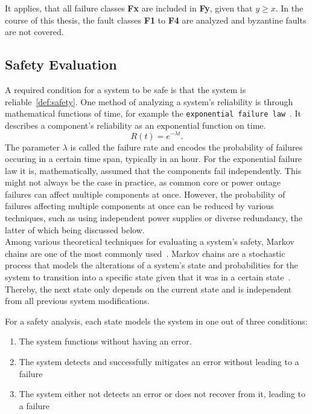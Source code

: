 It applies, that all failure classes \textbf{Fx} are included in \textbf{Fy}, given that $y \geq x$.
In the course of this thesis, the fault classes \textbf{F1} to \textbf{F4} are analyzed and byzantine faults are not covered.

\subsection{Safety Evaluation}
\label{sec:safetyEvaluation}
A required condition for a system to be safe is that the system is reliable~\autoref{def:safety}.
One method of analyzing a system's reliability is through mathematical functions of time, for example the \texttt{exponential failure law}~\cite{GeffroyMotetDependableComputing}.
It describes a component's reliability as an exponential function on time.
\begin{equation}
R(t) = e^{-\lambda t}.
\label{eq:expFailureLaw}
\end{equation}
The parameter $\lambda$ is called the failure rate and encodes the probability of failures occuring in a certain time span, typically in an hour.
For the exponential failure law it is, mathematically, assumed that the components fail independently.
This might not always be the case in practice, as common core or power outage failures can affect multiple components at once.
However, the probability of failures affecting multiple components at once can be reduced by various techniques, such as using independent power supplies or diverse redundancy, the latter of which being discussed below.
\\

Among various theoretical techniques for evaluating a system's safety, Markov chains are one of the most commonly used~\cite{BarryFaultToleranceAnalysis}.
Markov chains are a stochastic process that models the alterations of a system's state and probabilities for the system to transition into a specific state given that it was in a certain state~\cite{KemenyMarkovChains}.
Thereby, the next state only depends on the current state and is independent from all previous system modifications.

For a safety analysis, each state models the system in one out of three conditions:
\begin{enumerate}
\item The system functions without having an error.
\item The system detects and successfully mitigates an error without leading to a failure
\item The system either not detects an error or does not recover from it, leading to a failure
\end{enumerate}

